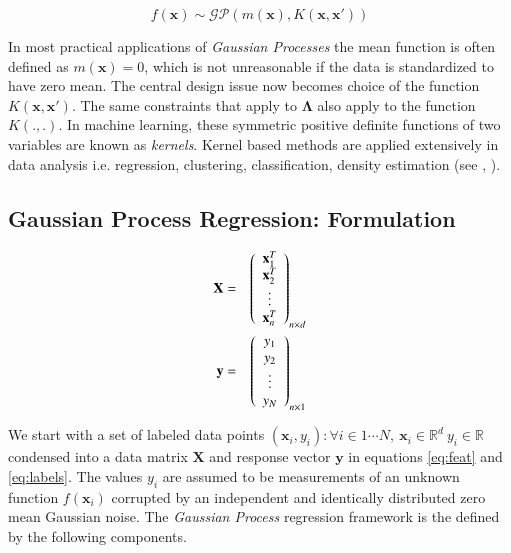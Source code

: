 \documentclass[referee,a4paper,12pt,traditabstract]{swsc}
\begin{document}
\begin{linenumbers}
\begin{equation}
    f(\mathbf{x}) \sim \mathcal{GP}(m(\mathbf{x}), K(\mathbf{x}, \mathbf{x}'))
\end{equation}

In most practical applications of \emph{Gaussian Processes} the mean function is often defined as $m(\mathbf{x}) = 0$, which is not unreasonable if the data is standardized to have zero mean. The central design issue now becomes choice of the function $K(\mathbf{x}, \mathbf{x}')$. The same constraints that apply to $\mathbf{\Lambda}$ also apply to the function $K(.,.)$. In machine learning, these symmetric positive definite functions of two variables are known as \emph{kernels}. Kernel based methods are applied extensively in data analysis i.e. regression, clustering, classification, density estimation (see \citet{Scholkopf:2001:LKS:559923}, \citet{hofmann2008}).

\subsection{Gaussian Process Regression: Formulation}

\begin{eqnarray}
  \mathbf{X} & = & \left( \begin{array}{c} \mathbf{x}^{T}_1 \\ \mathbf{x}^{T}_2 \\ \vdots \\ \mathbf{x}^{T}_n \end{array} \right)_{n \times d} \label{eq:feat} \\
  \vspace{2\baselineskip}
  \mathbf{y} & = & \left( \begin{array}{c} y_1 \\ y_2 \\ \vdots \\ y_N \end{array} \right) _{n \times 1} \label{eq:labels}
\end{eqnarray}

We start with a set of labeled data points $ {(\mathbf{x}_i, y_i): \forall i \in 1 \cdots N, \ \mathbf{x}_i \in \mathbb{R}^d \ y_i \in \mathbb{R}} $ condensed into a data matrix $\mathbf{X}$ and response vector $\mathbf{y}$ in equations \ref{eq:feat} and \ref{eq:labels}. The values $y_i$ are assumed to be measurements of an unknown function $f(\mathbf{x}_i)$ corrupted by an independent and identically distributed zero mean Gaussian noise. The \emph{Gaussian Process} regression framework is the defined by the following components.


\end{linenumbers}
\end{document}
